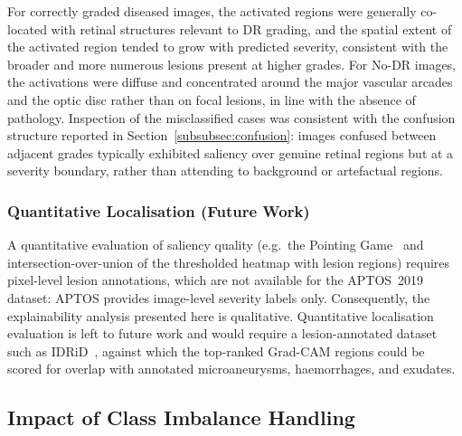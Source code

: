 For correctly graded diseased images, the activated regions were generally
co-located with retinal structures relevant to DR grading, and the spatial extent
of the activated region tended to grow with predicted severity, consistent with the
broader and more numerous lesions present at higher grades. For No-DR images, the
activations were diffuse and concentrated around the major vascular arcades and the
optic disc rather than on focal lesions, in line with the absence of pathology.
Inspection of the misclassified cases was consistent with the confusion structure
reported in Section~\ref{subsubsec:confusion}: images confused between adjacent
grades typically exhibited saliency over genuine retinal regions but at a severity
boundary, rather than attending to background or artefactual regions.


\subsubsection{Quantitative Localisation (Future Work)}
\label{subsubsec:xai_quantitative}

A quantitative evaluation of saliency quality (e.g.\ the Pointing
Game~\cite{zhang2016excitation} and intersection-over-union of the thresholded
heatmap with lesion regions) requires pixel-level lesion annotations, which are not
available for the APTOS~2019 dataset: APTOS provides image-level severity labels
only. Consequently, the explainability analysis presented here is qualitative.
Quantitative localisation evaluation is left to future work and would require a
lesion-annotated dataset such as IDRiD~\cite{porwal2018idrid}, against which the
top-ranked Grad-CAM regions could be scored for overlap with annotated
microaneurysms, haemorrhages, and exudates.

\subsection{Impact of Class Imbalance Handling}
\label{subsec:imbalance_results}

